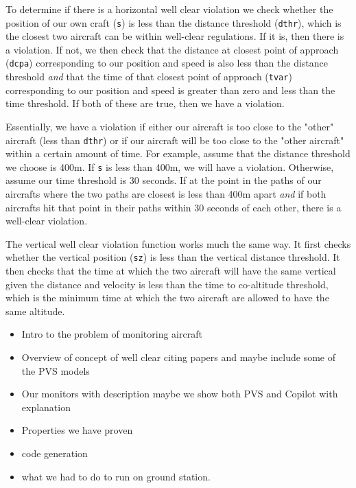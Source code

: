 To determine if there is a horizontal well clear violation we check whether the position of our own craft ({\tt s}) is less than the distance threshold ({\tt dthr}), which is the closest two aircraft can be within well-clear regulations. If it is, then there is a violation. If not, we then check that the distance at closest point of approach ({\tt dcpa}) corresponding to our position and speed is also less than the distance threshold \emph{and} that the time of that closest point of approach ({\tt tvar}) corresponding to our position and speed is greater than zero and less than the time threshold. If both of these are true, then we have a violation. 

Essentially, we have a violation if either our aircraft is too close to the "other" aircraft (less than {\tt dthr}) or if our aircraft will be too close to the "other aircraft" within a certain amount of time. For example, assume that the distance threshold we choose is 400m. If {\tt s} is less than 400m, we will have a violation. Otherwise, assume our time threshold is 30 seconds. If at the point in the paths of our aircrafts where the two paths are closest is less than 400m apart \emph{and} if both aircrafts hit that point in their paths within 30 seconds of each other, there is a well-clear violation. 

The vertical well clear violation function works much the same way. It first checks whether the vertical position ({\tt sz}) is less than the vertical distance threshold. It then checks that the time at which the two aircraft will have the same vertical given the distance and velocity is less than the time to co-altitude threshold, which is the minimum time at which the two aircraft are allowed to have the same altitude. 

\begin{itemize}
\item Intro to the problem of monitoring aircraft
\item Overview of concept of well clear citing papers and maybe include some of the PVS models
\item Our monitors with description maybe we show both PVS and Copilot with explanation
\item Properties we have proven
\item code generation 
\item what we had to do to run on ground station. 
\end{itemize}



